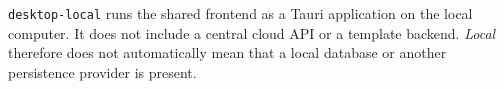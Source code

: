 \begin{beginnerstatement}

\texttt{desktop-local} runs the shared frontend as a Tauri application on the
local computer. It does not include a central cloud API or a template backend.
\emph{Local} therefore does not automatically mean that a local database or
another persistence provider is present.

\end{beginnerstatement}
